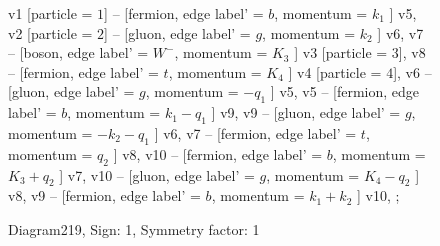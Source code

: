 \documentclass{revtex4}
\begin{document}
\begin{figure}[!htb]
\begin{center}
{    %
v1 [particle = \(1\)] -- [fermion, edge label' = \(b\), momentum = \(k_{1}\) ] v5, 
v2 [particle = \(2\)] -- [gluon, edge label' = \(g\), momentum = \(k_{2}\) ] v6, 
v7 -- [boson, edge label' = \(W^{-}\), momentum = \(K_{3}\) ] v3 [particle = \(3\)], 
v8 -- [fermion, edge label' = \(t\), momentum = \(K_{4}\) ] v4 [particle = \(4\)], 
v6 -- [gluon, edge label' = \(g\), momentum = \(-q_{1}\) ] v5, 
v5 -- [fermion, edge label' = \(b\), momentum = \(k_{1} - q_{1}\) ] v9, 
v9 -- [gluon, edge label' = \(g\), momentum = \(-k_{2} - q_{1}\) ] v6, 
v7 -- [fermion, edge label' = \(t\), momentum = \(q_{2}\) ] v8, 
v10 -- [fermion, edge label' = \(b\), momentum = \(K_{3} + q_{2}\) ] v7, 
v10 -- [gluon, edge label' = \(g\), momentum = \(K_{4} - q_{2}\) ] v8, 
v9 -- [fermion, edge label' = \(b\), momentum = \(k_{1} + k_{2}\) ] v10, 
};
\end{center}
\caption{Diagram219, Sign: 1, Symmetry factor: 1}
\end{figure}
\newpage
\end{document}
